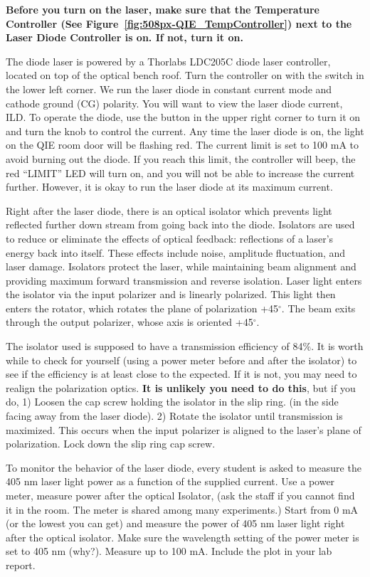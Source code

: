 \documentclass{../lab}
\begin{document}
\textbf{Before you turn on the laser, make sure that the Temperature Controller (See Figure~\ref{fig:508px-QIE_TempController}) next to the Laser Diode Controller is on. If not, turn it on.}

The diode laser is powered by a Thorlabs LDC205C diode laser controller, located on top of the optical bench roof. Turn the controller on with the switch in the lower left corner. We run the laser diode in constant current mode and cathode ground (CG) polarity. You will want to view the laser diode current, ILD. To operate the diode, use the button in the upper right corner to turn it on and turn the knob to control the current. Any time the laser diode is on, the light on the QIE room door will be flashing red. The current limit is set to 100 mA to avoid burning out the diode. If you reach this limit, the controller will beep, the red ``LIMIT'' LED will turn on, and you will not be able to increase the current further. However, it is okay to run the laser diode at its maximum current.

Right after the laser diode, there is an optical isolator which prevents light reflected further down stream from going back into the diode. Isolators are used to reduce or eliminate the effects of optical feedback: reflections of a laser’s energy back into itself. These effects include noise, amplitude fluctuation, and laser damage. Isolators protect the laser, while maintaining beam alignment and providing maximum forward transmission and reverse isolation. Laser light enters the isolator via the input polarizer and is linearly polarized. This light then enters the rotator, which rotates the plane of polarization +45$^\circ$. The beam exits through the output polarizer, whose axis is oriented +45$^\circ$.

The isolator used is supposed to have a transmission efficiency of 84\%. It is worth while to check for yourself (using a power meter before and after the isolator) to see if the efficiency is at least close to the expected. If it is not, you may need to realign the polarization optics. \textbf{It is unlikely you need to do this}, but if you do, 1) Loosen the cap screw holding the isolator in the slip ring. (in the side facing away from the laser diode). 2) Rotate the isolator until transmission is maximized. This occurs when the input polarizer is aligned to the laser’s plane of polarization. Lock down the slip ring cap screw.

To monitor the behavior of the laser diode, every student is asked to measure the 405 nm laser light power as a function of the supplied current. Use a power meter, measure power after the optical Isolator, (ask the staff if you cannot find it in the room. The meter is shared among many experiments.) Start from 0 mA (or the lowest you can get) and measure the power of 405 nm laser light right after the optical isolator. Make sure the wavelength setting of the power meter is set to 405 nm (why?). Measure up to 100 mA. Include the plot in your lab report.
\end{document}
